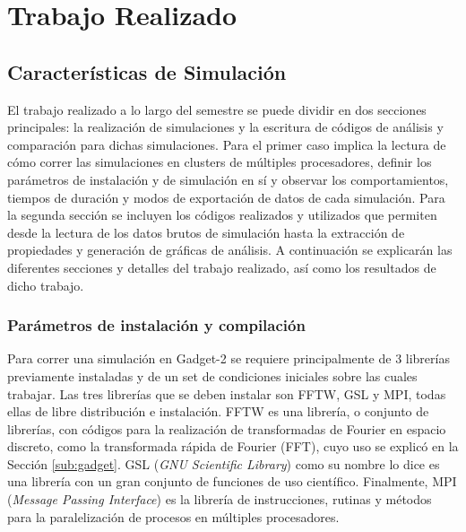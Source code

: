 \chapter{Trabajo Realizado}
\label{chap:trabajo}

\section{Características de Simulación}
El trabajo realizado a lo largo del semestre se puede dividir en dos secciones principales: la realización de simulaciones y la escritura de códigos de análisis y comparación para dichas simulaciones. Para el primer caso implica la lectura de cómo correr las simulaciones en clusters de múltiples procesadores, definir los parámetros de instalación y de simulación en sí y observar los comportamientos, tiempos de duración y modos de exportación de datos de cada simulación. Para la segunda sección se incluyen los códigos realizados y utilizados que permiten desde la lectura de los datos brutos de simulación hasta la extracción de propiedades y generación de gráficas de análisis. A continuación se explicarán las diferentes secciones y detalles del trabajo realizado, así como los resultados de dicho trabajo.

\subsection{Parámetros de instalación y compilación}
Para correr una simulación en Gadget-2 se requiere principalmente de 3 librerías previamente instaladas y de un set de condiciones iniciales sobre las cuales trabajar. Las tres librerías que se deben instalar son FFTW, GSL y MPI, todas ellas de libre distribución e instalación. FFTW es una librería, o conjunto de librerías, con códigos para la realización de transformadas de Fourier en espacio discreto, como la transformada rápida de Fourier (FFT), cuyo uso se explicó en la Sección \ref{sub:gadget}. GSL (\textit{GNU Scientific Library}) como su nombre lo dice es una librería con un gran conjunto de funciones de uso científico. Finalmente, MPI (\textit{Message Passing Interface}) es la librería de instrucciones, rutinas y métodos para la paralelización de procesos en múltiples procesadores. 

